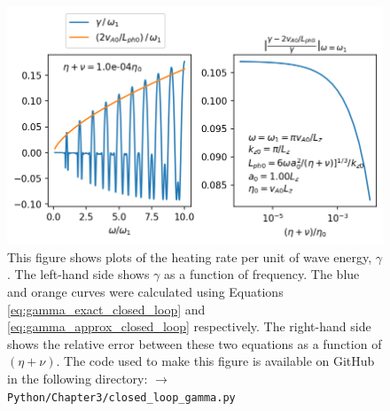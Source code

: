 \begin{figure}
    \vspace{-20pt}
    \centering
    \includegraphics[width=\textwidth,height=0.85\textheight,keepaspectratio]{figures/chapter03/closed_loop_gamma.png}
    \vspace{-30pt}
    \caption{This figure shows plots of the heating rate per unit of wave energy, $\gamma$. The left-hand side shows $\gamma$ as a function of frequency. The blue and orange curves were calculated using Equations \eqref{eq:gamma_exact_closed_loop} and \eqref{eq:gamma_approx_closed_loop} respectively. The right-hand side shows the relative error between these two equations as a function of $(\eta+\nu)$. The code used to make this figure is available on GitHub in the following directory:\newline
    \texttt{$\rightarrow$ Python/Chapter3/closed\_loop\_gamma.py}}
    \label{fig:closed_loop_gamma}
    \vspace{-10pt}
\end{figure}

